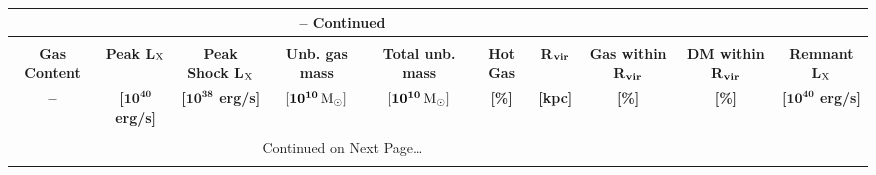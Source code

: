 \documentclass{article}
\newcommand{\Msun}{{\rm M}_{\odot}}
\begin{document}
\begin{landscape}
\begin{longtable}{cccccccccc}
\multicolumn{8}{c}{{\tablename} \thetable{} -- Continued}\\[0.5ex]
  \hline \hline \\[-2ex]
   \multicolumn{1}{c}{\textbf{Gas Content}} &
   \multicolumn{1}{c}{\textbf{Peak L$\mathbf{_{\rm X}}$}} &
   \multicolumn{1}{c}{\textbf{Peak Shock L$\mathbf{_{\rm X}}$}} &
   \multicolumn{1}{c}{\textbf{Unb. gas mass}}  &
   \multicolumn{1}{c}{\textbf{Total unb. mass}} &
   \multicolumn{1}{c}{\textbf{Hot Gas}} &
   \multicolumn{1}{c}{\textbf{R$_{\rm \mathbf{vir}}$}} &
   \multicolumn{1}{c}{\textbf{Gas within \textbf{R$_{\rm \mathbf{vir}}$}}} &
   \multicolumn{1}{c}{\textbf{DM  within \textbf{R$_{\rm \mathbf{vir}}$}}} &
   \multicolumn{1}{c}{\textbf{Remnant L$_\mathbf{\rm X}$}} \\[0.8ex] 
   \multicolumn{1}{c}{\textbf{--}} &
   \multicolumn{1}{c}{\textbf{[$\mathbf{10^{40}}$ erg/s]}} &
   \multicolumn{1}{c}{\textbf{[$\mathbf{10^{38}}$ erg/s]}} &
   \multicolumn{1}{c}{$\mathbf{ [10^{10} \,\Msun ]}$} &
   \multicolumn{1}{c}{$\mathbf{ [10^{10} \,\Msun ]}$} &
   \multicolumn{1}{c}{\textbf{[\%]}} &
   \multicolumn{1}{c}{\textbf{[kpc]}} &
   \multicolumn{1}{c}{\textbf{[\%]}} &
   \multicolumn{1}{c}{\textbf{[\%]}} &
   \multicolumn{1}{c}{\textbf{[$\mathbf{10^{40}}$ erg/s]}} \\[0.5ex]\hline \hline \\[-2ex]
\endhead

\multicolumn{8}{c}{{Continued on Next Page\ldots}} \\
\endfoot


\end{longtable}
\end{landscape}
\end{document}
